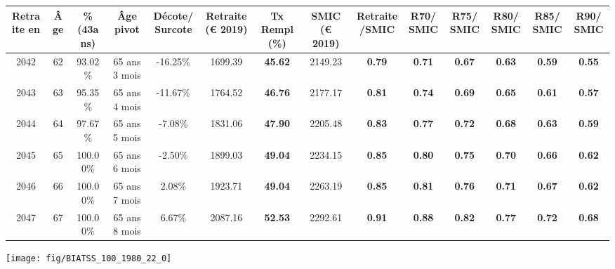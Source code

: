 \begin{adjustbox}{max width=\textwidth} 
\begin{tabular}[htb]{|c|c||c|c|c||c|c||c|c||c|c|c|c|c|} 
\hline 
 Retraite en &  Âge &  \%(43ans) &  Âge pivot &  Décote/Surcote &  Retraite (\euro{} 2019) &  Tx Rempl(\%) &  SMIC (\euro{} 2019) &  Retraite/SMIC &  R70/SMIC &  R75/SMIC &  R80/SMIC &  R85/SMIC &  R90/SMIC \\ 
\hline \hline 
 2042 &  62 &  93.02\% &  65 ans 3 mois &  -16.25\% &  1699.39 &  {\bf 45.62} &  2149.23 &  {\bf {\color{red} 0.79}} &  {\bf {\color{red} 0.71}} &  {\bf {\color{red} 0.67}} &  {\bf {\color{red} 0.63}} &  {\bf {\color{red} 0.59}} &  {\bf {\color{red} 0.55}} \\ 
\hline 
 2043 &  63 &  95.35\% &  65 ans 4 mois &  -11.67\% &  1764.52 &  {\bf 46.76} &  2177.17 &  {\bf {\color{red} 0.81}} &  {\bf {\color{red} 0.74}} &  {\bf {\color{red} 0.69}} &  {\bf {\color{red} 0.65}} &  {\bf {\color{red} 0.61}} &  {\bf {\color{red} 0.57}} \\ 
\hline 
 2044 &  64 &  97.67\% &  65 ans 5 mois &  -7.08\% &  1831.06 &  {\bf 47.90} &  2205.48 &  {\bf {\color{red} 0.83}} &  {\bf {\color{red} 0.77}} &  {\bf {\color{red} 0.72}} &  {\bf {\color{red} 0.68}} &  {\bf {\color{red} 0.63}} &  {\bf {\color{red} 0.59}} \\ 
\hline 
 2045 &  65 &  100.00\% &  65 ans 6 mois &  -2.50\% &  1899.03 &  {\bf 49.04} &  2234.15 &  {\bf {\color{red} 0.85}} &  {\bf {\color{red} 0.80}} &  {\bf {\color{red} 0.75}} &  {\bf {\color{red} 0.70}} &  {\bf {\color{red} 0.66}} &  {\bf {\color{red} 0.62}} \\ 
\hline 
 2046 &  66 &  100.00\% &  65 ans 7 mois &  2.08\% &  1923.71 &  {\bf 49.04} &  2263.19 &  {\bf {\color{red} 0.85}} &  {\bf {\color{red} 0.81}} &  {\bf {\color{red} 0.76}} &  {\bf {\color{red} 0.71}} &  {\bf {\color{red} 0.67}} &  {\bf {\color{red} 0.62}} \\ 
\hline 
 2047 &  67 &  100.00\% &  65 ans 8 mois &  6.67\% &  2087.16 &  {\bf 52.53} &  2292.61 &  {\bf {\color{red} 0.91}} &  {\bf {\color{red} 0.88}} &  {\bf {\color{red} 0.82}} &  {\bf {\color{red} 0.77}} &  {\bf {\color{red} 0.72}} &  {\bf {\color{red} 0.68}} \\ 
\hline 
\hline 
\end{tabular} 
\end{adjustbox} 
 
 \vspace{0.1cm} 

 {\hspace{-2.2cm}\texttt{[image: fig/BIATSS\_100\_1980\_22\_0]}} 

